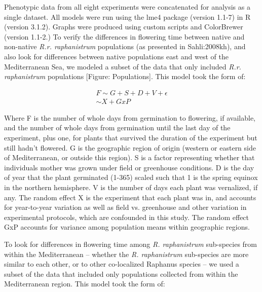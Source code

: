 \documentclass[twocolumn]{bmcart}%
\begin{document}
Phenotypic data from all eight experiments were concatenated for analysis as a single dataset. All models were run using the lme4 package (version 1.1-7) in R (version 3.1.2). Graphs were produced using custom scripts and ColorBrewer (version 1.1-2.) 
%
%
%
To verify the differences in flowering time between native and non-native \textit{R.r. raphanistrum} populations (as presented in {Sahli:2008kh}), and also look for differences between native populations east and west of the Mediterranean Sea, we modeled a subset of the data that only included \textit{R.r. raphanistrum} populations [Figure: Populations]. This model took the form of:

\begin{gather*}
F \sim G + S + D + V + \epsilon\\
%
%
%
\sim X + G x P
\end{gather*}

Where F is the number of whole days from germination to flowering, if available, and the number of whole days from germination until the last day of the experiment, plus one, for plants that survived the duration of the experiment but still hadn’t flowered. G is the geographic region of origin (western or eastern side of Mediterranean, or outside this region). S is a factor representing whether that individuals mother was grown under field or greenhouse conditions. D is the day of year that the plant germinated (1-365) scaled such that 1 is the spring equinox in the northern hemisphere. V is the number of days each plant was vernalized, if any.  The random effect X is the experiment that each plant was in, and accounts for year-to-year variation as well as field vs. greenhouse and other variation in experimental protocols, which are confounded in this study. The random effect GxP accounts for variance among population means within geographic regions.

To look for differences in flowering time among \textit{R. raphanistrum} sub-species from within the Mediterranean – whether the \textit{R. raphanistrum} sub-species are more similar to each other, or to other co-localized Raphanus species – we used a subset of the data that included only populations collected from within the Mediterranean region. This model took the form of:
\end{document}
